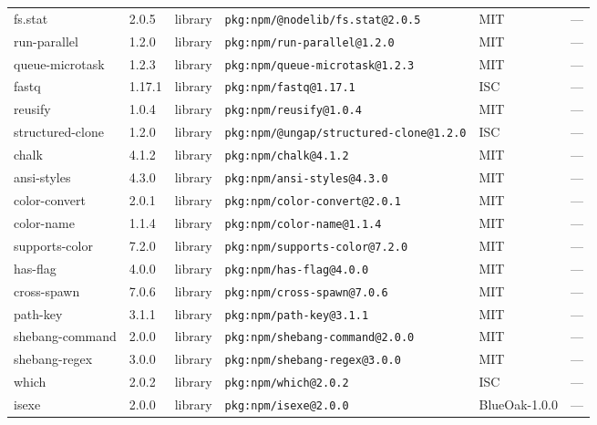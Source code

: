 \documentclass[11pt,a4paper]{article}
\begin{document}
\begin{longtable}{|p{4cm}|p{2cm}|p{1.6cm}|p{5cm}|p{1.5cm}|p{3.5cm}|}
\raggedright fs.stat & 2.0.5 & library & \small\texttt{pkg:npm/@nodelib/fs.stat@2.0.5} & MIT & \small — \\
\raggedright run-parallel & 1.2.0 & library & \small\texttt{pkg:npm/run-parallel@1.2.0} & MIT & \small — \\
\raggedright queue-microtask & 1.2.3 & library & \small\texttt{pkg:npm/queue-microtask@1.2.3} & MIT & \small — \\
\raggedright fastq & 1.17.1 & library & \small\texttt{pkg:npm/fastq@1.17.1} & ISC & \small — \\
\raggedright reusify & 1.0.4 & library & \small\texttt{pkg:npm/reusify@1.0.4} & MIT & \small — \\
\raggedright structured-clone & 1.2.0 & library & \small\texttt{pkg:npm/@ungap/structured-clone@1.2.0} & ISC & \small — \\
\raggedright chalk & 4.1.2 & library & \small\texttt{pkg:npm/chalk@4.1.2} & MIT & \small — \\
\raggedright ansi-styles & 4.3.0 & library & \small\texttt{pkg:npm/ansi-styles@4.3.0} & MIT & \small — \\
\raggedright color-convert & 2.0.1 & library & \small\texttt{pkg:npm/color-convert@2.0.1} & MIT & \small — \\
\raggedright color-name & 1.1.4 & library & \small\texttt{pkg:npm/color-name@1.1.4} & MIT & \small — \\
\raggedright supports-color & 7.2.0 & library & \small\texttt{pkg:npm/supports-color@7.2.0} & MIT & \small — \\
\raggedright has-flag & 4.0.0 & library & \small\texttt{pkg:npm/has-flag@4.0.0} & MIT & \small — \\
\raggedright cross-spawn & 7.0.6 & library & \small\texttt{pkg:npm/cross-spawn@7.0.6} & MIT & \small — \\
\raggedright path-key & 3.1.1 & library & \small\texttt{pkg:npm/path-key@3.1.1} & MIT & \small — \\
\raggedright shebang-command & 2.0.0 & library & \small\texttt{pkg:npm/shebang-command@2.0.0} & MIT & \small — \\
\raggedright shebang-regex & 3.0.0 & library & \small\texttt{pkg:npm/shebang-regex@3.0.0} & MIT & \small — \\
\raggedright which & 2.0.2 & library & \small\texttt{pkg:npm/which@2.0.2} & ISC & \small — \\
\raggedright isexe & 2.0.0 & library & \small\texttt{pkg:npm/isexe@2.0.0} & BlueOak-1.0.0 & \small — \\

\end{longtable}
\end{document}

